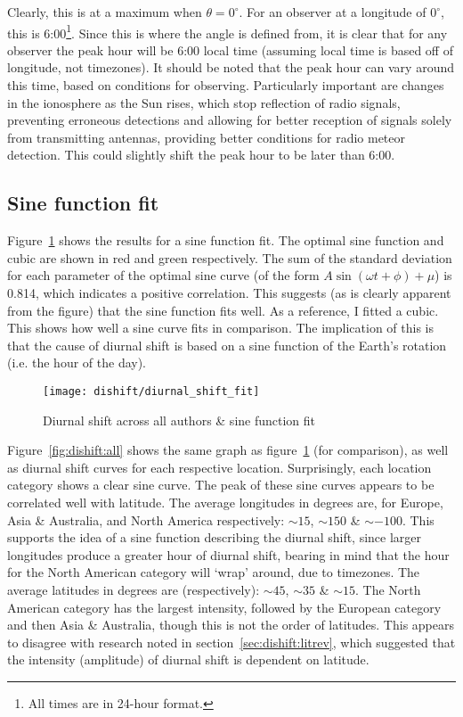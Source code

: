 Clearly, this is at a maximum when $\theta = 0^{\circ}$. For an observer at a longitude of $0^{\circ}$, this is 6:00\footnote{All times are in 24-hour format.}. Since this is where the angle is defined from, it is clear that for any observer the peak hour will be 6:00 local time (assuming local time is based off of longitude, not timezones). It should be noted that the peak hour can vary around this time, based on conditions for observing. Particularly important are changes in the ionosphere as the Sun rises, which stop reflection of radio signals, preventing erroneous detections and allowing for better reception of signals solely from transmitting antennas, providing better conditions for radio meteor detection. This could slightly shift the peak hour to be later than 6:00.

\subsection{Sine function fit}
Figure~\ref{fig:dishift:fit} shows the results for a sine function fit. The optimal sine function and cubic are shown in red and green respectively.  The sum of the standard deviation for each parameter of the optimal sine curve (of the form $A \sin \left( \omega t + \phi \right) + \mu$) is 0.814, which indicates a positive correlation. This suggests (as is clearly apparent from the figure) that the sine function fits well. As a reference, I fitted a cubic. This shows how well a sine curve fits in comparison. The implication of this is that the cause of diurnal shift is based on a sine function of the Earth's rotation (i.e. the hour of the day).

\begin{figure}[h!]
	\centering
	\texttt{[image: dishift/diurnal\_shift\_fit]}
	\caption{Diurnal shift across all authors \& sine function fit
		\label{fig:dishift:fit}}
\end{figure}

Figure~\ref{fig:dishift:all} shows the same graph as figure~\ref{fig:dishift:fit} (for comparison), as well as diurnal shift curves for each respective location. Surprisingly, each location category shows a clear sine curve. The peak of these sine curves appears to be correlated well with latitude. The average longitudes in degrees are, for Europe, Asia \& Australia, and North America respectively: $\sim 15$, $\sim 150$ \& $\sim -100$. This supports the idea of a sine function describing the diurnal shift, since larger longitudes produce a greater hour of diurnal shift, bearing in mind that the hour for the North American category will `wrap' around, due to timezones. The average latitudes in degrees are (respectively): $\sim 45$, $\sim 35$ \& $\sim 15$. The North American category has the largest intensity, followed by the European category and then Asia \& Australia, though this is not the order of latitudes. This appears to disagree with research noted in section~\ref{sec:dishift:litrev}, which suggested that the intensity (amplitude) of diurnal shift is dependent on latitude.  

